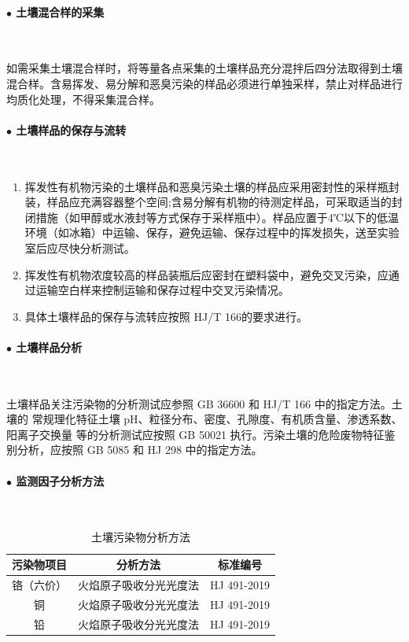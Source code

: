 \paragraph{$\bullet $ 土壤混合样的采集}~{}\par
如需采集土壤混合样时，将等量各点采集的土壤样品充分混拌后四分法取得到土壤混合样。含易挥发、易分解和恶臭污染的样品必须进行单独采样，禁止对样品进行均质化处理，不得采集混合样。

\paragraph{$\bullet $ 土壤样品的保存与流转}~{}\par
\begin{enumerate}
    \item 挥发性有机物污染的土壤样品和恶臭污染土壤的样品应采用密封性的采样瓶封装，样品应充满容器整个空间;含易分解有机物的待测定样品，可采取适当的封闭措施（如甲醇或水液封等方式保存于采样瓶中）。样品应置于4℃以下的低温环境（如冰箱）中运输、保存，避免运输、保存过程中的挥发损失，送至实验室后应尽快分析测试。
    \item 挥发性有机物浓度较高的样品装瓶后应密封在塑料袋中，避免交叉污染，应通过运输空白样来控制运输和保存过程中交叉污染情况。
    \item 具体土壤样品的保存与流转应按照 HJ/T 166的要求进行。
\end{enumerate}

\paragraph{$\bullet $ 土壤样品分析}~{}\par
土壤样品关注污染物的分析测试应参照 GB 36600 和 HJ/T 166 中的指定方法。土壤的
常规理化特征土壤 pH、粒径分布、密度、孔隙度、有机质含量、渗透系数、阳离子交换量
等的分析测试应按照 GB 50021 执行。污染土壤的危险废物特征鉴别分析，应按照 GB 5085
和 HJ 298 中的指定方法。

\paragraph{$\bullet $ 监测因子分析方法}~{}\par
\begin{table}[H]
    \centering
    \caption{土壤污染物分析方法}
    \begin{tabular}{ccc}
    \toprule
    污染物项目  & 分析方法  & 标准编号 \\
    \midrule
    铬（六价）  & 火焰原子吸收分光光度法 & HJ 491-2019 \\
    铜      & 火焰原子吸收分光光度法 & HJ 491-2019 \\
    铅     & 火焰原子吸收分光光度法 & HJ 491-2019 \\
    \bottomrule
    \end{tabular}
    \label{tab:Methods for soil pollutant analysis}
\end{table}



